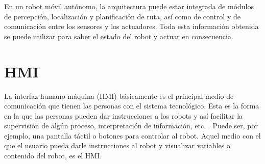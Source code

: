 En un robot móvil autónomo, la arquitectura puede estar integrada de módulos de percepción, localización y planificación de ruta, así como de control y de comunicación entre los sensores y los actuadores. Toda esta información obtenida se puede utilizar para saber el estado del robot y actuar en consecuencia.

\section{HMI}
\label{sec:HMI}

La interfaz humano-máquina (HMI) básicamente es el principal medio de comunicación que tienen las personas con el sistema tecnológico. Esta es la forma en la que las personas pueden dar instrucciones a los robots y así facilitar la supervisión de algún proceso, interpretación de información, etc. \cite{MT12}. Puede ser, por ejemplo, una pantalla táctil o botones para controlar al robot. Aquel medio con el que el usuario pueda darle instrucciones al robot y visualizar variables o contenido del robot, es el HMI.
